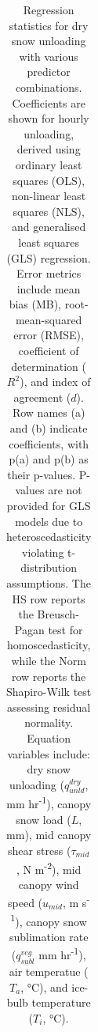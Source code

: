 \documentclass[
  letterpaper,
]{tex/uofsthesis-cs}
\begin{document}
\begin{landscape}

\begin{longtable}[]{@{}
  >{\raggedright\arraybackslash}p{}
  >{\raggedright\arraybackslash}p{}
  >{\raggedright\arraybackslash}p{}
  >{\raggedright\arraybackslash}p{}
  >{\raggedright\arraybackslash}p{}
  >{\raggedright\arraybackslash}p{}
  >{\raggedright\arraybackslash}p{}
  >{\raggedright\arraybackslash}p{}@{}}

\caption{\label{tbl-dry-snow-reg-full}Regression statistics for dry snow
unloading with various predictor combinations. Coefficients are shown
for hourly unloading, derived using ordinary least squares (OLS),
non-linear least squares (NLS), and generalised least squares (GLS)
regression. Error metrics include mean bias (MB), root-mean-squared
error (RMSE), coefficient of determination (\(R^2\)), and index of
agreement (\(d\)). Row names (a) and (b) indicate coefficients, with
p(a) and p(b) as their p-values. P-values are not provided for GLS
models due to heteroscedasticity violating t-distribution assumptions.
The HS row reports the Breusch-Pagan test for homoscedasticity, while
the Norm row reports the Shapiro-Wilk test assessing residual normality.
Equation variables include: dry snow unloading (\(q_{unld}^{dry}\), mm
hr\textsuperscript{-1}), canopy snow load (\(L\), mm), mid canopy shear
stress (\(\tau_{mid}\), N m\textsuperscript{-2}), mid canopy wind speed
(\(u_{mid}\), m s\textsuperscript{-1}), canopy snow sublimation rate
(\(q_{subl}^{veg}\) mm hr\textsuperscript{-1}), air temperatue (\(T_a\),
°C), and ice-bulb temperature (\(T_i\), °C).}

\tabularnewline


\end{longtable}
\end{landscape}
\end{document}
